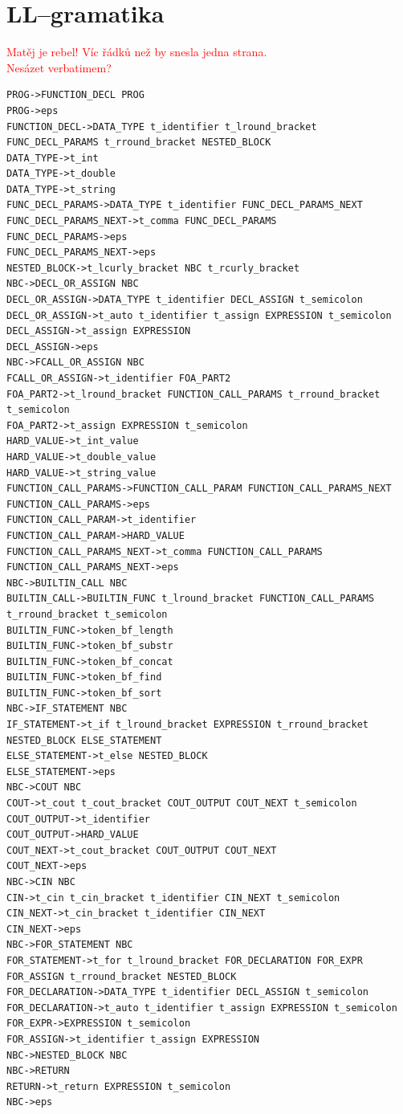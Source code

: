 \documentclass[a4paper, 12pt]{article}
\begin{document}
\section{LL--gramatika} \label{llgram}
\textcolor{red}{Matěj je rebel! Víc řádků než by snesla jedna strana.} \\
\textcolor{red}{Nesázet verbatimem?}
{\scriptsize
\begin{verbatim}
PROG->FUNCTION_DECL PROG
PROG->eps
FUNCTION_DECL->DATA_TYPE t_identifier t_lround_bracket FUNC_DECL_PARAMS t_rround_bracket NESTED_BLOCK
DATA_TYPE->t_int
DATA_TYPE->t_double
DATA_TYPE->t_string
FUNC_DECL_PARAMS->DATA_TYPE t_identifier FUNC_DECL_PARAMS_NEXT
FUNC_DECL_PARAMS_NEXT->t_comma FUNC_DECL_PARAMS
FUNC_DECL_PARAMS->eps
FUNC_DECL_PARAMS_NEXT->eps
NESTED_BLOCK->t_lcurly_bracket NBC t_rcurly_bracket
NBC->DECL_OR_ASSIGN NBC
DECL_OR_ASSIGN->DATA_TYPE t_identifier DECL_ASSIGN t_semicolon
DECL_OR_ASSIGN->t_auto t_identifier t_assign EXPRESSION t_semicolon
DECL_ASSIGN->t_assign EXPRESSION
DECL_ASSIGN->eps
NBC->FCALL_OR_ASSIGN NBC
FCALL_OR_ASSIGN->t_identifier FOA_PART2
FOA_PART2->t_lround_bracket FUNCTION_CALL_PARAMS t_rround_bracket t_semicolon
FOA_PART2->t_assign EXPRESSION t_semicolon
HARD_VALUE->t_int_value
HARD_VALUE->t_double_value
HARD_VALUE->t_string_value
FUNCTION_CALL_PARAMS->FUNCTION_CALL_PARAM FUNCTION_CALL_PARAMS_NEXT
FUNCTION_CALL_PARAMS->eps
FUNCTION_CALL_PARAM->t_identifier
FUNCTION_CALL_PARAM->HARD_VALUE
FUNCTION_CALL_PARAMS_NEXT->t_comma FUNCTION_CALL_PARAMS
FUNCTION_CALL_PARAMS_NEXT->eps
NBC->BUILTIN_CALL NBC
BUILTIN_CALL->BUILTIN_FUNC t_lround_bracket FUNCTION_CALL_PARAMS t_rround_bracket t_semicolon
BUILTIN_FUNC->token_bf_length
BUILTIN_FUNC->token_bf_substr
BUILTIN_FUNC->token_bf_concat
BUILTIN_FUNC->token_bf_find
BUILTIN_FUNC->token_bf_sort
NBC->IF_STATEMENT NBC
IF_STATEMENT->t_if t_lround_bracket EXPRESSION t_rround_bracket NESTED_BLOCK ELSE_STATEMENT
ELSE_STATEMENT->t_else NESTED_BLOCK
ELSE_STATEMENT->eps
NBC->COUT NBC
COUT->t_cout t_cout_bracket COUT_OUTPUT COUT_NEXT t_semicolon
COUT_OUTPUT->t_identifier
COUT_OUTPUT->HARD_VALUE
COUT_NEXT->t_cout_bracket COUT_OUTPUT COUT_NEXT
COUT_NEXT->eps
NBC->CIN NBC
CIN->t_cin t_cin_bracket t_identifier CIN_NEXT t_semicolon
CIN_NEXT->t_cin_bracket t_identifier CIN_NEXT
CIN_NEXT->eps
NBC->FOR_STATEMENT NBC
FOR_STATEMENT->t_for t_lround_bracket FOR_DECLARATION FOR_EXPR FOR_ASSIGN t_rround_bracket NESTED_BLOCK
FOR_DECLARATION->DATA_TYPE t_identifier DECL_ASSIGN t_semicolon
FOR_DECLARATION->t_auto t_identifier t_assign EXPRESSION t_semicolon
FOR_EXPR->EXPRESSION t_semicolon
FOR_ASSIGN->t_identifier t_assign EXPRESSION
NBC->NESTED_BLOCK NBC
NBC->RETURN
RETURN->t_return EXPRESSION t_semicolon
NBC->eps
\end{verbatim}
}
\newpage
\end{document}
